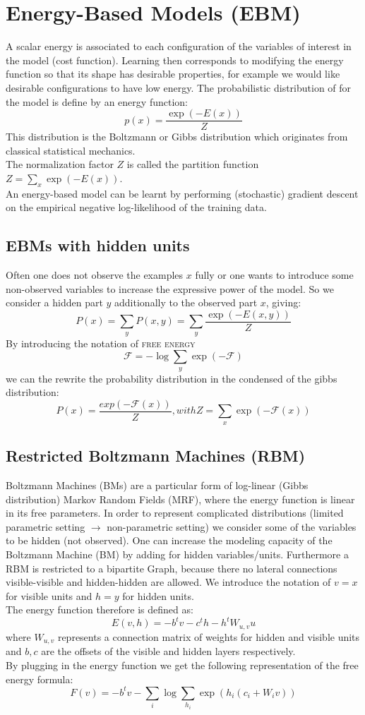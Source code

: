 \documentclass[11pt]{article}
\begin{document}
\section{Energy-Based Models (EBM)}
A scalar energy is associated to each configuration of the variables of interest in the model (cost function). Learning then corresponds to modifying the energy function so that its shape has desirable properties, for example we would like desirable configurations to have low energy. The probabilistic distribution of for the model is define by an energy function:
\[
	p(x)=\frac{\exp(-E(x))}{Z}
\]
This distribution is the Boltzmann or Gibbs distribution which originates from classical statistical mechanics.\\
The normalization factor $Z$ is called the partition function $Z=\sum_x \exp(-E(x))$.\\
An energy-based model can be learnt by performing (stochastic) gradient descent on the empirical negative log-likelihood of the training data.

\subsection{EBMs with hidden units}
Often one does not observe the examples $x$ fully or one wants to introduce some non-observed variables to increase the expressive power of the model. So we consider a hidden part $y$ additionally to the observed part $x$, giving:
\[ 
	P(x) = \sum_y P(x,y) = \sum_y \frac{\exp(-E(x,y))}{Z}
\]
By introducing the notation of \textsc{free energy}
\[
	\mathcal{F}= -\log\sum_y \exp(-\mathcal{F})
\]
we can the rewrite the probability distribution in the condensed of the gibbs distribution:
\[
	P(x)=\frac{exp(-\mathcal{F}(x))}{Z}, with Z=\sum_x \exp(-\mathcal{F}(x))
\]

\subsection{Restricted Boltzmann Machines (RBM)}
Boltzmann Machines (BMs) are a particular form of log-linear (Gibbs distribution) Markov Random Fields (MRF), where the energy function is linear in its free parameters. In order to represent complicated distributions (limited parametric setting $\rightarrow$ non-parametric setting) we consider some of the variables to be hidden (not observed). One can increase the modeling capacity of the Boltzmann Machine (BM) by adding for hidden variables/units. Furthermore a RBM is restricted to a bipartite Graph, because there no lateral connections visible-visible and hidden-hidden are allowed. We introduce the notation of $v=x$ for visible units and $h=y$ for hidden units.\\
The energy function therefore is defined as:
\[
	E(v,h)=-b^{t}v-c^{t}h-h^{t}W_{u,v}u
\]
where $W_{u,v}$ represents a connection matrix of weights for hidden and visible units and $b,c$ are the offsets of the visible and hidden layers respectively.\\
By plugging in the energy function we get the following representation of the free energy formula:\\
\[
	F(v)=-b^{t}v-\sum_i\log\sum_{h_i} \exp(h_i(c_i+W_iv))
\]
\end{document}
